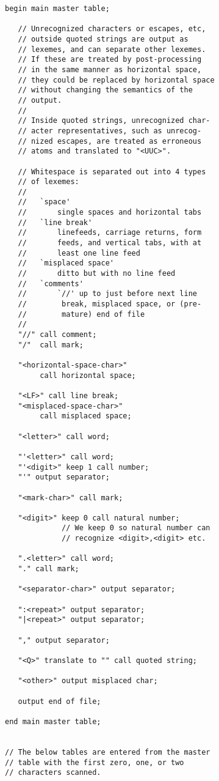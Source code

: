 \documentclass[12pt]{article}
\newenvironment{indpar}[1][0.3in]%
	{\begin{list}{}%
		     {\setlength{\itemsep}{0in}%
		      \setlength{\topsep}{0in}%
		      \setlength{\parsep}{1ex}%
		      \setlength{\labelwidth}{#1}%
		      \setlength{\leftmargin}{#1}%
		      \addtolength{\leftmargin}{\labelsep}}%
	 \item}%
	{\end{list}}
\begin{document}
\begin{indpar}
\begin{verbatim}
begin main master table;

   // Unrecognized characters or escapes, etc,
   // outside quoted strings are output as
   // lexemes, and can separate other lexemes.
   // If these are treated by post-processing
   // in the same manner as horizontal space,
   // they could be replaced by horizontal space
   // without changing the semantics of the
   // output.
   //
   // Inside quoted strings, unrecognized char-
   // acter representatives, such as unrecog-
   // nized escapes, are treated as erroneous
   // atoms and translated to "<UUC>".

   // Whitespace is separated out into 4 types
   // of lexemes:
   //
   //   `space'
   //       single spaces and horizontal tabs
   //   `line break'
   //       linefeeds, carriage returns, form
   //       feeds, and vertical tabs, with at
   //       least one line feed
   //   `misplaced space'
   //       ditto but with no line feed
   //   `comments'
   //       `//' up to just before next line
   //        break, misplaced space, or (pre-
   //        mature) end of file
   //
   "//" call comment;
   "/"  call mark;

   "<horizontal-space-char>"
        call horizontal space;

   "<LF>" call line break;
   "<misplaced-space-char>"
        call misplaced space;

   "<letter>" call word;

   "'<letter>" call word;
   "'<digit>" keep 1 call number;
   "'" output separator;

   "<mark-char>" call mark;

   "<digit>" keep 0 call natural number;
             // We keep 0 so natural number can
             // recognize <digit>,<digit> etc.

   ".<letter>" call word;
   "." call mark;

   "<separator-char>" output separator;

   ":<repeat>" output separator;
   "|<repeat>" output separator;

   "," output separator;

   "<Q>" translate to "" call quoted string;

   "<other>" output misplaced char;

   output end of file;

end main master table;


// The below tables are entered from the master
// table with the first zero, one, or two
// characters scanned.



\end{verbatim}
\end{indpar}
\end{document}
